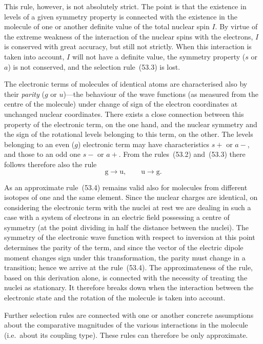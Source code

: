 This rule, however, is not absolutely strict. The point is that the existence in levels of a given symmetry property is connected with the existence in the molecule of one or another definite value of the total nuclear spin $I$. By virtue of the extreme weakness of the interaction of the nuclear spins with the electrons, $I$ is conserved with great accuracy, but still not strictly. When this interaction is taken into account, $I$ will not have a definite value, the symmetry property ($s$ or $a$) is not conserved, and the selection rule~(53.3) is lost.

The electronic terms of molecules of identical atoms are characterised also by their \textit{parity} ($g$ or $u$)---the behaviour of the wave functions (as measured from the centre of the molecule) under change of sign of the electron coordinates at unchanged nuclear coordinates. There exists a close connection between this property of the electronic term, on the one hand, and the nuclear symmetry and the sign of the rotational levels belonging to this term, on the other. The levels belonging to an even ($g$) electronic term may have characteristics $s+$ or $a-$, and those to an odd one $s-$ or $a+$. From the rules~(53.2) and~(53.3) there follows therefore also the rule
\begin{equation}
\mathrm{g} \to \mathrm{u},\qquad \mathrm{u} \to \mathrm{g}.
\tag{53.4}
\end{equation}

As an approximate rule~(53.4) remains valid also for molecules from different isotopes of one and the same element. Since the nuclear charges are identical, on considering the electronic term with the nuclei at rest we are dealing in such a case with a system of electrons in an electric field possessing a centre of symmetry (at the point dividing in half the distance between the nuclei). The symmetry of the electronic wave function with respect to inversion at this point determines the parity of the term, and since the vector of the electric dipole moment changes sign under this transformation, the parity must change in a transition; hence we arrive at the rule~(53.4). The approximateness of the rule, based on this derivation alone, is connected with the necessity of treating the nuclei as stationary. It therefore breaks down when the interaction between the electronic state and the rotation of the molecule is taken into account.

Further selection rules are connected with one or another concrete assumptions about the comparative magnitudes of the various interactions in the molecule (i.e.\ about its coupling type). These rules can therefore be only approximate.

